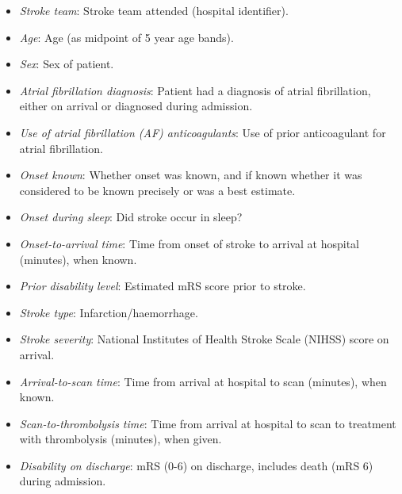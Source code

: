 \begin{itemize}


    \item \textit{Stroke team}: Stroke team attended (hospital identifier).

    \item \textit{Age}: Age (as midpoint of 5 year age bands).

    \item \textit{Sex}: Sex of patient. %

    \item \textit{Atrial fibrillation diagnosis}: Patient had a diagnosis of atrial fibrillation, either on arrival or diagnosed during admission.

    \item \textit{Use of atrial fibrillation (AF) anticoagulants}: Use of prior anticoagulant for atrial fibrillation.

    \item \textit{Onset known}: Whether onset was known, and if known whether it was considered to be known precisely or was a best estimate.

    \item \textit{Onset during sleep}: Did stroke occur in sleep?

    \item \textit{Onset-to-arrival time}: Time from onset of stroke to arrival at hospital (minutes), when known.

    \item \textit{Prior disability level}: Estimated mRS score prior to stroke.

    \item \textit{Stroke type}: Infarction/haemorrhage.

    \item \textit{Stroke severity}: National Institutes of Health Stroke Scale (NIHSS) score on arrival.

    \item \textit{Arrival-to-scan time}: Time from arrival at hospital to scan (minutes), when known.

    \item \textit{Scan-to-thrombolysis time}: Time from arrival at hospital to scan to treatment with thrombolysis (minutes), when given.

    \item \textit{Disability on discharge}: mRS (0-6) on discharge, includes death (mRS 6) during admission.
    
\end{itemize}

